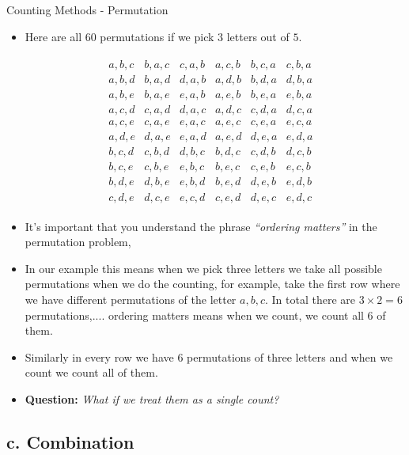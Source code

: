 \documentclass[8pt,usepdftitle=false]{beamer}
\begin{document}
\begin{frame}[allowframebreaks]{Counting Methods - Permutation}
\begin{itemize}
\item Here are all $60$ permutations if we pick $3$ letters out of $5$.


\begin{align*}
\begin{array}{llllll}
a,b,c &
b,a,c &
c,a,b &
a,c,b &
b,c,a &
c,b,a \\
a,b,d &
b,a,d &
d,a,b &
a,d,b &
b,d,a &
d,b,a \\
a,b,e &
b,a,e &
e,a,b &
a,e,b &
b,e,a &
e,b,a \\
a,c,d &
c,a,d &
d,a,c &
a,d,c &
c,d,a &
d,c,a \\
a,c,e &
c,a,e &
e,a,c &
a,e,c &
c,e,a &
e,c,a \\
a,d,e &
d,a,e &
e,a,d &
a,e,d &
d,e,a &
e,d,a \\
b,c,d &
c,b,d &
d,b,c &
b,d,c &
c,d,b &
d,c,b \\
b,c,e &
c,b,e &
e,b,c &
b,e,c &
c,e,b &
e,c,b \\
b,d,e &
d,b,e &
e,b,d &
b,e,d &
d,e,b &
e,d,b \\
c,d,e &
d,c,e &
e,c,d &
c,e,d &
d,e,c &
e,d,c &
\end{array}
\end{align*}

\item It's important that you understand the phrase \emph{``ordering matters''} in the permutation problem, 

\item In our example this means when we pick three letters we take all possible permutations when we do the counting, for example, take the first row where we have different permutations of the letter $a, b, c$. In total there are $3 \times 2 = 6$ permutations,.... ordering matters means when we count, we count all $6$ of them. 

\item Similarly in every row we have $6$ permutations of three letters and when we count we count all of them.

\item \textbf{Question:} \emph{What if we treat them as a single count?}

\end{itemize}
\end{frame}

\subsection{c. Combination}
\frame{\subsectionpage}
\end{document}
